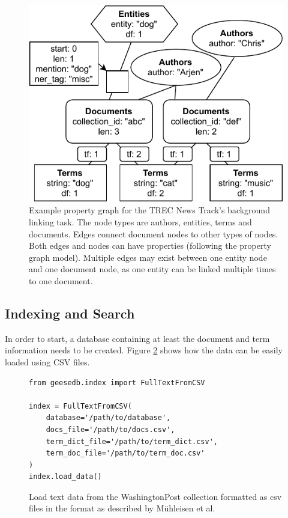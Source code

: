 \begin{figure}
	\centering
	\includegraphics[width=\linewidth]{./imgs/example_full_graph.pdf}
	\caption{Example property graph for the TREC News Track's background linking task. The node types are authors, entities, terms and documents. Edges connect document nodes to other types of nodes. Both edges and nodes can have properties (following the property graph model). Multiple edges may exist between one entity node and one document node, as one entity can be linked multiple times to one document.}
	\label{fig:geesedb-graph}
\end{figure}

\subsection{Indexing and Search}
In order to start, a database containing at least the document and term information needs to be created. Figure \ref{fig:load_text_data} shows how the data can be easily loaded using CSV files.
\begin{figure}
	\begin{verbatim}
from geesedb.index import FullTextFromCSV

index = FullTextFromCSV(
	database='/path/to/database',
	docs_file='/path/to/docs.csv',
	term_dict_file='/path/to/term_dict.csv',
	term_doc_file='/path/to/term_doc.csv'
)
index.load_data()
	\end{verbatim}
	\caption{Load text data from the WashingtonPost collection formatted as csv files in the format as described by M\"uhleisen et al.~\cite{OldDog}}
	\label{fig:load_text_data}
\end{figure}

